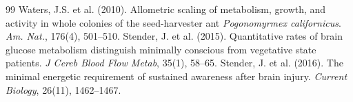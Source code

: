 \documentclass[letterpaper]{article}
\begin{document}
\begin{thebibliography}{99}
 Waters, J.S. et al. (2010). Allometric scaling of metabolism, growth, and activity in whole colonies of the seed-harvester ant \emph{Pogonomyrmex californicus}. \emph{Am. Nat.}, 176(4), 501--510.
 Stender, J. et al. (2015). Quantitative rates of brain glucose metabolism distinguish minimally conscious from vegetative state patients. \emph{J Cereb Blood Flow Metab}, 35(1), 58--65.
 Stender, J. et al. (2016). The minimal energetic requirement of sustained awareness after brain injury. \emph{Current Biology}, 26(11), 1462--1467.
\end{thebibliography}
\end{document}
